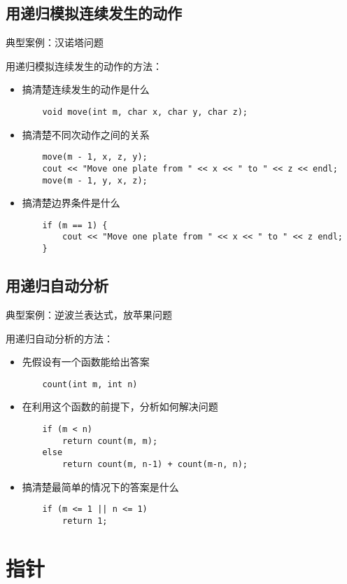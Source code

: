 \documentclass[UTF8]{ctexart}
\begin{document}
\subsection{用递归模拟连续发生的动作}
典型案例：汉诺塔问题

用递归模拟连续发生的动作的方法：
\begin{itemize}
    \item 搞清楚连续发生的动作是什么
    \begin{verbatim}
    void move(int m, char x, char y, char z);
    \end{verbatim}
    \item 搞清楚不同次动作之间的关系
    \begin{verbatim}
    move(m - 1, x, z, y);
    cout << "Move one plate from " << x << " to " << z << endl;
    move(m - 1, y, x, z);
    \end{verbatim}
    \item 搞清楚边界条件是什么
    \begin{verbatim}
    if (m == 1) {
        cout << "Move one plate from " << x << " to " << z endl;
    }
    \end{verbatim}
\end{itemize}

\subsection{用递归自动分析}
典型案例：逆波兰表达式，放苹果问题

用递归自动分析的方法：
\begin{itemize}
    \item 先假设有一个函数能给出答案
    \begin{verbatim}
    count(int m, int n)
    \end{verbatim}
    \item 在利用这个函数的前提下，分析如何解决问题
    \begin{verbatim}
    if (m < n)
        return count(m, m);
    else
        return count(m, n-1) + count(m-n, n);
    \end{verbatim}
    \item  搞清楚最简单的情况下的答案是什么
    \begin{verbatim}
    if (m <= 1 || n <= 1)
        return 1;
    \end{verbatim}
\end{itemize}

\section{指针}
\end{document}
